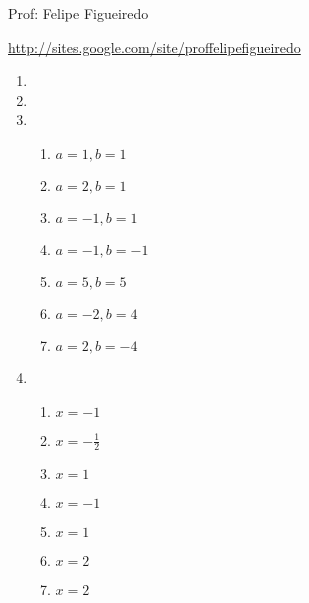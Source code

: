 \documentclass[a4paper]{article}
\begin{document}
\parbox[c]{.825\textwidth}{\raggedright%
{Prof: Felipe Figueiredo\par}
{\url{http://sites.google.com/site/proffelipefigueiredo}}

\vspace{1cm}
}


\begin{enumerate}

\section{}

\section{}

\item %

\item %

\item %
  \begin{enumerate}
  \item $a=1, b=1$
  \item $a=2, b=1$
  \item $a=-1, b=1$
  \item $a=-1, b=-1$
  \item $a=5, b=5$
  \item $a=-2, b=4$
  \item $a=2, b=-4$
  \end{enumerate}
\item %

  \begin{enumerate}
  \item $x= -1$ %
  \item $x= -\frac{1}{2}$ %
  \item $x= 1$ %
  \item $x= -1$ %
  \item $x= 1$ %
  \item $x= 2$ %
  \item $x= 2$ %
  \end{enumerate}


\end{enumerate}
\end{document}
